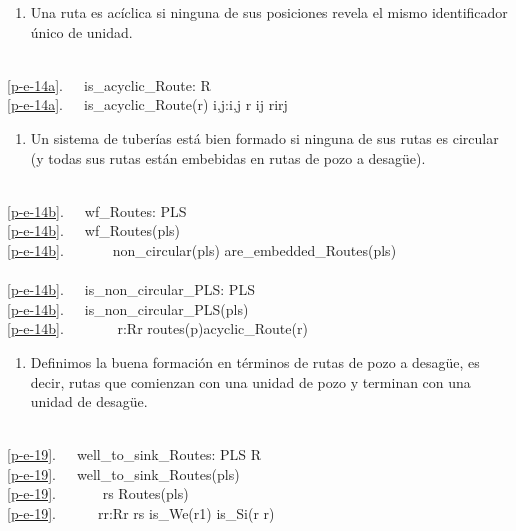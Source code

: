 \label{Wellformed Pipes}

\begin{enumerate}\setei
\item \label{p-e-14a}  Una ruta es acíclica si ninguna de sus posiciones
  revela el mismo identificador único de unidad.
\savei\end{enumerate}
\bp
\>\ \\
\ref{p-e-14a}.\ \ \ is\_acyclic\_Route: R {\RIGHTARROW} \\
\ref{p-e-14a}.\ \ \ is\_acyclic\_Route(r) {\IS} {\SIM}{\EXISTS} i,j:i,j{\RBRACE}{\SUBSETEQ} r {\WEDGE} i{\NOTEQ}j {\WEDGE} r{\LBRACKET}i{\RBRACKET}{\EQ}r{\LBRACKET}j{\RBRACKET}
\ep

\mnewfoil

\begin{enumerate}\setei
\item \label{p-e-14b}  Un sistema de tuberías está bien formado si ninguna de sus
                      rutas es circular (y todas sus rutas
                      están embebidas en rutas de pozo a desagüe). 
\savei\end{enumerate}
\bp
\>\ \\
\ref{p-e-14b}.\ \ \ wf\_Routes: PLS {\RIGHTARROW} \\
\ref{p-e-14b}.\ \ \ wf\_Routes(pls) {\IS}\ \ \label{pipe:wfRoutes}\\
\ref{p-e-14b}.\ \ \ \ \ \ \ non\_circular(pls) {\WEDGE} are\_embedded\_Routes(pls)\\
\\
\ref{p-e-14b}.\ \ \ is\_non\_circular\_PLS: PLS {\RIGHTARROW} \\
\ref{p-e-14b}.\ \ \ is\_non\_circular\_PLS(pls) {\IS} \\
\ref{p-e-14b}.\ \ \ \ \ \ \ {\ALL} r:R{\RDOT}r {\ISIN} routes(p){\WEDGE}acyclic\_Route(r)
\ep

\mnewfoil

\begin{enumerate}\setei
\item \label{p-e-19}  Definimos la buena formación en términos de
  rutas de pozo a desagüe, es decir, rutas que comienzan con una unidad de pozo y
  terminan con una unidad de desagüe.
\savei\end{enumerate}

\bp
\>\ \ \ \ \\
\ref{p-e-19}.\ \ \ well\_to\_sink\_Routes: PLS {\RIGHTARROW} R\\
\ref{p-e-19}.\ \ \ well\_to\_sink\_Routes(pls) {\IS}\\
\ref{p-e-19}.\ \ \ \ \ \  rs {\EQ} Routes(pls) \\
\ref{p-e-19}.\ \ \ \ \ \ {\LBRACE}r{\BAR}r:R{\RDOT}r {\ISIN} rs {\WEDGE} is\_We(r{\LBRACKET}1{\RBRACKET}) {\WEDGE} is\_Si(r{\LBRACKET} r{\RBRACKET}){\RBRACE} 
\ep

